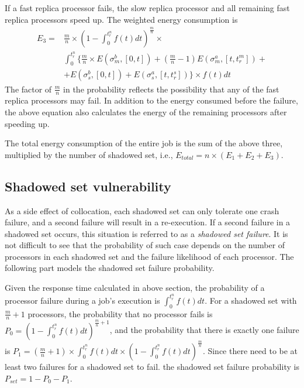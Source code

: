 If a fast replica processor fails, the slow replica processor and all remaining fast replica processors speed up. The weighted energy consumption is 
\begin{equation}
\begin{split}
E_3 = & \frac{m}{n} \times (1-\int_{0}^{t_r^n} f(t)dt)^{\frac{m}{n}}  \times \\
      & \int_{0}^{t_r^n} \{\frac{m}{n} \times E(\sigma_m^b, [0,t]) + (\frac{m}{n}-1)E(\sigma_m^a,[t, t_r^m]) + \\ 
      & +E(\sigma_s^b, [0,t])+E(\sigma_s^a, [t,t_r^s])\} \times f(t)dt
\end{split}
\end{equation}  
The factor of $\frac{m}{n}$ in the probability reflects the possibility that any of the fast replica processors may fail. In addition to the energy consumed before the failure, the above equation also calculates the energy of the remaining processors after speeding up. 

The total energy consumption of the entire job is the sum of the above three, multiplied by the number of shadowed set, i.e., $E_{total}=n \times (E_1+E_2+E_3)$.

\subsection{Shadowed set vulnerability}
As a side effect of collocation, each shadowed set can only tolerate one crash failure, and a second failure will result in a re-execution.  If a second failure in a shadowed set occurs, this situation is referred to as a \textit{shadowed set failure}. It is not difficult to see that the probability of such case depends on the number of processors in each shadowed set and the failure likelihood of each processor. The following part models the shadowed set failure probability. 

Given the response time calculated in above section, the probability of a processor failure during a job's execution is $\int_{0}^{t_r^n} f(t)dt$. For a shadowed set with $\frac{m}{n}+1$ processors, the probability that no processor fails is $P_0=(1-\int_{0}^{t_r^n} f(t)dt)^{\frac{m}{n}+1}$, and the probability that there is exactly one failure is $P_1 = (\frac{m}{n}+1) \times \int_{0}^{t_r^n} f(t)dt \times (1-\int_{0}^{t_r^n} f(t)dt)^{\frac{m}{n}}$.
Since there need to be at least two failures for a shadowed set to fail. the shadowed set failure probability is $P_{set} = 1 - P_0 - P_1$. 


